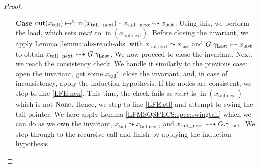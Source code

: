 \documentclass[a4paper, 10pt]{report}
\theoremstyle{definition}
\newcommand{\nIn}[1]{\operatorname{in}(#1)}
\newcommand{\nOut}[1]{\operatorname{out}(#1)}
\newcommand{\node}{x}
\newcommand{\nodeN}[1]{\node_{\mathrm{#1}}}
\newcommand{\nodetail}{\nodeN{tail}}
\newcommand{\nodelast}{\nodeN{last}}
\newcommand{\nodetailnext}{\nodeN{tail\_next}}
\newcommand{\Qg}{G}
\newcommand{\glast}{\gname_{\mathrm{Last}}}
\newcommand{\reach}[2]{#1 \leadsto #2}
\newcommand{\ar}[2]{#1 \dashrightarrow #2}
\newcommand{\ap}[2]{#1 \rightarrowtail #2}
\begin{document}
\begin{proof}
\begin{itemize}
    \item[\textbf{Case}]
    $\nOut{\nodetail} \mapsto^{\persistently} \nIn{\nodetailnext} \star{} \reach{\nodetailnext}{\nodelast}$. Using this, we perform the load, which sets $next$ to $\nIn{\nodetailnext}$. Before closing the invariant, we apply Lemma \ref{lemma:abs-reach-abs} with $\reach{\nodetailnext}{\nodelast}$ and $\ap{\Qg.\glast}{\nodelast}$ to obtain $\ar{\nodetailnext}{\Qg.\glast}$. We now proceed to close the invariant. Next, we reach the consistency check. We handle it similarly to the previous case: open the invariant, get some $\nodetail'$, close the invariant, and, in case of inconsistency, apply the induction hypothesis. If the nodes are consistent, we step to line \ref{LFE:nen}. This time, the check fails as $next$ is $\nIn{\nodetailnext}$ which is not $\operatorname{None}$. Hence, we step to line \ref{LFE:stl} and attempt to swing the tail pointer. We here apply Lemma \ref{LFMSQSPECS:spec:swingtail} which we can do as we own the invariant, $\reach{\nodetail}{\nodetailnext}$, and $\ar{\nodetailnext}{\Qg.\glast}$. We step through to the recursive call and finish by applying the induction hypothesis.
  \end{itemize}
\end{proof}
\end{document}
